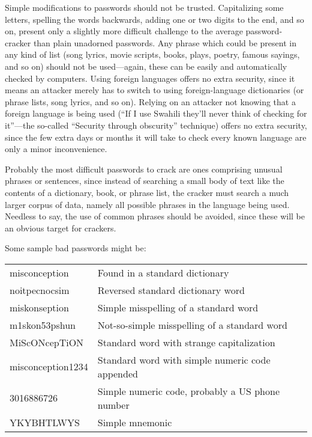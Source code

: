 Simple modifications to passwords should not be trusted.  Capitalizing some
letters, spelling the words backwards, adding one or two digits to the end, and
so on, present only a slightly more difficult challenge to the average
password-cracker than plain unadorned passwords.  Any phrase which could be
present in any kind of list (song lyrics, movie scripts, books, plays, poetry,
famous sayings, and so on) should not be used---again, these can be easily and
automatically checked by computers.  Using foreign languages offers no extra
security, since it means an attacker merely has to switch to using
foreign-language dictionaries (or phrase lists, song lyrics, and so on).
Relying on an attacker not knowing that a foreign language is being used (``If I
use Swahili they'll never think of checking for it''---the so-called ``Security
through obscurity'' technique) offers no extra security, since the few extra
days or months it will take to check every known language are only a minor
inconvenience.

Probably the most difficult passwords to crack are ones comprising unusual
phrases or sentences, since instead of searching a small body of text like the
contents of a dictionary, book, or phrase list, the cracker must search a much
larger corpus of data, namely all possible phrases in the language being used.
Needless to say, the use of common phrases should be avoided, since these will
be an obvious target for crackers.

Some sample bad passwords might be:

\begin{center}
\begin{tabular}{l l}
    misconception        &     Found in a standard dictionary\\
    noitpecnocsim        &     Reversed standard dictionary word\\
    miskonseption        &     Simple misspelling of a standard word\\
    m1skon53pshun        &     Not-so-simple misspelling of a standard word\\
    MiScONcepTiON        &     Standard word with strange capitalization\\
    misconception1234    &     Standard word with simple numeric code appended\\
    3016886726           &     Simple numeric code, probably a US phone number\\
    YKYBHTLWYS           &     Simple mnemonic\\
\end{tabular}
\end{center}

